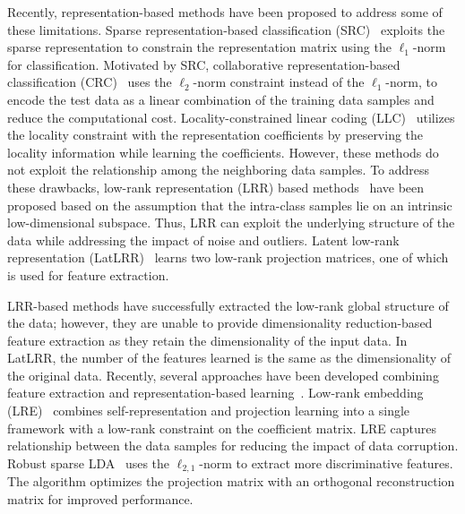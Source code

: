 Recently, representation-based methods have been proposed to address some of these limitations. Sparse representation-based classification (SRC)~\cite{SRC} exploits the sparse representation to constrain the representation matrix using the $\ell_{1}$-norm for classification. Motivated by SRC, collaborative representation-based classification (CRC)~\cite{CRC} uses the $\ell_{2}$-norm constraint instead of the $\ell_{1}$-norm, to encode the test data as a linear combination of the training data samples and reduce the computational cost. Locality-constrained linear coding (LLC)~\cite{LLC} utilizes the locality constraint with the representation coefficients by preserving the locality information while learning the coefficients. However, these methods do not exploit the relationship among the neighboring data samples. To address these drawbacks, low-rank representation (LRR) based methods~\cite{LRR_subspace,Learn_Bal_Unbal_graph} have been proposed based on the assumption that the intra-class samples lie on an intrinsic low-dimensional subspace. Thus, LRR can exploit the underlying structure of the data while addressing the impact of noise and outliers. Latent low-rank representation (LatLRR)~\cite{LatLRR} learns two low-rank projection matrices, one of which is used for feature extraction.

LRR-based methods have successfully extracted the low-rank global structure of the data; however, they are unable to provide dimensionality reduction-based feature extraction as they retain the dimensionality of the input data. In LatLRR, the number of the features learned is the same as the dimensionality of the original data. Recently, several approaches have been developed combining feature extraction and representation-based learning~\cite{PLR,LRE,RLSL,SRRS,SALPL,CDPL}. Low-rank embedding (LRE)~\cite{LRE} combines self-representation and projection learning into a single framework with a low-rank constraint on the coefficient matrix. LRE captures relationship between the data samples for reducing the impact of data corruption. Robust sparse LDA~\cite{RSLDA} uses the $\ell_{2,1}$-norm to extract more discriminative features. The algorithm optimizes the projection matrix with an orthogonal reconstruction matrix for improved performance.

